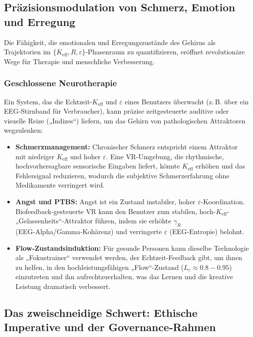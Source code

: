 \documentclass[12pt,a4paper]{article}
\newcommand{\eff}{\mathrm{eff}}
\newcommand{\Ke}{K_{\eff}}
\newcommand{\Keff}{\Ke}
\begin{document}
	\subsection{Präzisionsmodulation von Schmerz, Emotion und Erregung}
	
	Die Fähigkeit, die emotionalen und Erregungszustände des Gehirns als Trajektorien im \(\{K_{\mathrm{eff}}, R, \varepsilon\}\)-Phasenraum zu quantifizieren, eröffnet revolutionäre Wege für Therapie und menschliche Verbesserung.
	
	\subsubsection{Geschlossene Neurotherapie}
	Ein System, das die Echtzeit-\(K_{\mathrm{eff}}\) und \(\varepsilon\) eines Benutzers überwacht (z. B. über ein EEG‑Stirnband für Verbraucher), kann präzise zeitgesteuerte auditive oder visuelle Reize („Indizes“) liefern, um das Gehirn von pathologischen Attraktoren wegzulenken:
	\begin{itemize}
		\item \textbf{Schmerzmanagement:} Chronischer Schmerz entspricht einem Attraktor mit niedriger \(K_{\mathrm{eff}}\) und hoher \(\varepsilon\). Eine VR‑Umgebung, die rhythmische, hochvorhersagbare sensorische Eingaben liefert, könnte \(K_{\mathrm{eff}}\) erhöhen und das Fehlersignal reduzieren, wodurch die subjektive Schmerzerfahrung ohne Medikamente verringert wird.
		\item \textbf{Angst und PTBS:} Angst ist ein Zustand instabiler, hoher \(\varepsilon\)-Koordination. Biofeedback‑gesteuerte VR kann den Benutzer zum stabilen, hoch-\(\Keff\)-„Gelassenheits“-Attraktor führen, indem sie erhöhte \(\gamma_R\) (EEG‑Alpha/Gamma‑Kohärenz) und verringerte \(\varepsilon\) (EEG‑Entropie) belohnt.
		\item \textbf{Flow‑Zustandsinduktion:} Für gesunde Personen kann dieselbe Technologie als „Fokustrainer“ verwendet werden, der Echtzeit‑Feedback gibt, um ihnen zu helfen, in den hochleistungsfähigen „Flow“-Zustand (\(L_c \approx 0.8-0.95\)) einzutreten und ihn aufrechtzuerhalten, was das Lernen und die kreative Leistung dramatisch verbessert.
	\end{itemize}
	
	\subsection{Das zweischneidige Schwert: Ethische Imperative und der Governance‑Rahmen}
	
\end{document}
